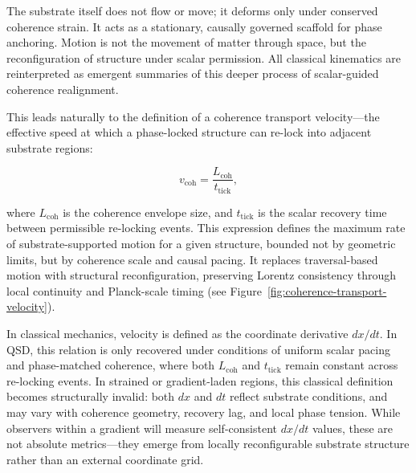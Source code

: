 \documentclass[entropy,article,submit,pdftex,moreauthors]{Definitions/mdpi}
\begin{document}
The substrate itself does not flow or move; it deforms only under conserved coherence strain. It acts as a stationary, causally governed scaffold for phase anchoring. Motion is not the movement of matter through space, but the reconfiguration of structure under scalar permission. All classical kinematics are reinterpreted as emergent summaries of this deeper process of scalar-guided coherence realignment.

This leads naturally to the definition of a coherence transport velocity—the effective speed at which a phase-locked structure can re-lock into adjacent substrate regions:

\begin{equation}
    v_{\text{coh}} = \frac{L_{\text{coh}}}{t_{\text{tick}}},
\end{equation}

where \( L_{\text{coh}} \) is the coherence envelope size, and \( t_{\text{tick}} \) is the scalar recovery time between permissible re-locking events. This expression defines the maximum rate of substrate-supported motion for a given structure, bounded not by geometric limits, but by coherence scale and causal pacing. It replaces traversal-based motion with structural reconfiguration, preserving Lorentz consistency through local continuity and Planck-scale timing (see Figure~\ref{fig:coherence-transport-velocity}).

In classical mechanics, velocity is defined as the coordinate derivative \( dx/dt \). In QSD, this relation is only recovered under conditions of uniform scalar pacing and phase-matched coherence, where both \( L_{\text{coh}} \) and \( t_{\text{tick}} \) remain constant across re-locking events. In strained or gradient-laden regions, this classical definition becomes structurally invalid: both \( dx \) and \( dt \) reflect substrate conditions, and may vary with coherence geometry, recovery lag, and local phase tension. While observers within a gradient will measure self-consistent \( dx/dt \) values, these are not absolute metrics—they emerge from locally reconfigurable substrate structure rather than an external coordinate grid.
\end{document}
